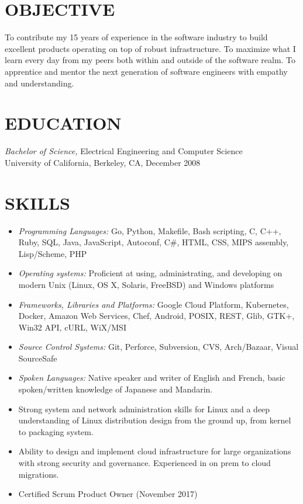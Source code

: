 \documentclass[overlapped,line,margin]{res}
\begin{document}
\address{
   Queens, NY, USA
   +1 (510) 646-0724
   \href{https://github.com/joshk0}{joshk0}
   \href{https://linkedin.com/in/joshk0}{joshk0}
}

\begin{resume}

\section{OBJECTIVE}
To contribute my 15 years of experience in the software industry to
build excellent products operating on top of robust infrastructure.
To maximize what I learn every day from my peers both within and outside
of the software realm.
To apprentice and mentor the next generation of software engineers with
empathy and understanding.

\section{EDUCATION} {\sl Bachelor of Science,} Electrical Engineering and Computer Science \\
  University of California, Berkeley, CA, December 2008

\section{SKILLS}
\begin{itemize}
\item {\sl Programming Languages:}
  Go, Python, Makefile, Bash scripting, C, C++, Ruby, SQL, Java, JavaScript,
  Autoconf, C\#, HTML, CSS, MIPS assembly, Lisp/Scheme, PHP
\item {\sl Operating systems:}
  Proficient at using, administrating, and developing on modern Unix (Linux,
  OS X, Solaris, FreeBSD) and Windows platforms
\item {\sl Frameworks, Libraries and Platforms:}
  Google Cloud Platform, Kubernetes, Docker, Amazon Web Services, Chef,
  Android, POSIX, REST, Glib, GTK+, Win32 API, cURL, WiX/MSI
\item {\sl Source Control Systems:}
  Git, Perforce, Subversion, CVS, Arch/Bazaar, Visual SourceSafe
\item {\sl Spoken Languages:}
  Native speaker and writer of English and French,
  basic spoken/written knowledge of Japanese and Mandarin.
\item Strong system and network administration skills for Linux and a
  deep understanding of Linux distribution design from the ground up, from
  kernel to packaging system.
\item Ability to design and implement cloud infrastructure for large
  organizations with strong security and governance. Experienced in
  on prem to cloud migrations.
\item Certified Scrum Product Owner (November 2017)
\end{itemize}


\end{resume}
\end{document}
